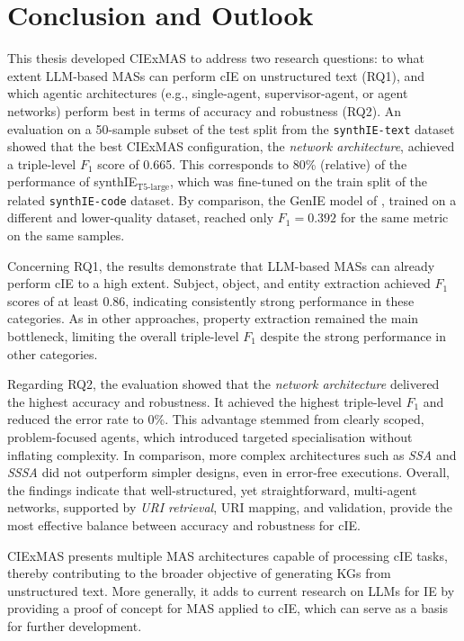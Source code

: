 \documentclass[a4paper,oneside,bibliography=totoc]{scrbook}
\begin{document}
\chapter{Conclusion and Outlook}
\label{ch:conclusion_outlook}

This thesis developed CIExMAS to address two research questions: to what extent \ac{LLM}-based \acp{MAS} can perform \ac{cIE} on unstructured text (RQ1), and which agentic architectures (e.g., single-agent, supervisor-agent, or agent networks) perform best in terms of accuracy and robustness (RQ2). An evaluation on a 50-sample subset of the test split from the \texttt{synthIE-text} dataset showed that the best CIExMAS configuration, the \textit{network architecture}, achieved a triple-level $F_{1}$ score of 0.665. This corresponds to 80\% (relative) of the performance of synthIE$_{\text{T5-large}}$, which was fine-tuned on the train split of the related \texttt{synthIE-code} dataset. By comparison, the GenIE model of \citet{Josifoski2021}, trained on a different and lower-quality dataset, reached only $F_{1}=0.392$ for the same metric on the same samples.

Concerning RQ1, the results demonstrate that \ac{LLM}-based \acp{MAS} can already perform \ac{cIE} to a high extent. Subject, object, and entity extraction achieved $F_{1}$ scores of at least 0.86, indicating consistently strong performance in these categories. As in other approaches, property extraction remained the main bottleneck, limiting the overall triple-level $F_{1}$ despite the strong performance in other categories.

Regarding RQ2, the evaluation showed that the \textit{network architecture} delivered the highest accuracy and robustness. It achieved the highest triple-level $F_{1}$ and reduced the error rate to 0\%. This advantage stemmed from clearly scoped, problem-focused agents, which introduced targeted specialisation without inflating complexity. In comparison, more complex architectures such as \textit{\ac{SSA}} and \textit{\ac{SSSA}} did not outperform simpler designs, even in error-free executions. Overall, the findings indicate that well-structured, yet straightforward, multi-agent networks, supported by \textit{\ac{URI} retrieval}, \ac{URI} mapping, and validation, provide the most effective balance between accuracy and robustness for \ac{cIE}.

CIExMAS presents multiple \ac{MAS} architectures capable of processing \ac{cIE} tasks, thereby contributing to the broader objective of generating \acp{KG} from unstructured text. More generally, it adds to current research on \acp{LLM} for \ac{IE} by providing a proof of concept for \ac{MAS} applied to \ac{cIE}, which can serve as a basis for further development.
\end{document}
